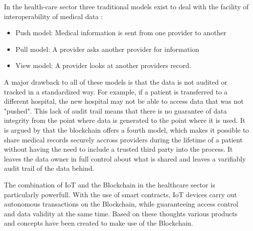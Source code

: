 In the health-care sector three traditional models exist to deal with the facility of interoperability of medical data \cite{Kshetri2017}:
\begin{itemize}
	\item Push model: Medical information is sent from one provider to another
	\item Pull model: A provider asks another provider for information
	\item View model: A provider looks at another providers record.
\end{itemize}
A major drawback to all of these models is that the data is not audited or tracked in a standardized way. For example, if a patient is transferred to a different hospital, the new hospital may not be able to access data that was not "pushed". This lack of audit trail means that there is no guarantee of data integrity from the point where data is generated to the point where it is used. 
It is argued by \cite{Kshetri2017} that the blockchain offers a fourth model, which makes it possible to share medical records securely accross providers during the lifetime of a patient without having the need to include a trusted third party into the process. It leaves the data owner in full control about what is shared and leaves a varifiably audit trail of the data behind.

The combination of IoT and the Blockchain in the healthcare sector is particularly powerfull. With the use of smart contracts, IoT devices carry out autonomous transactions on the Blockchain, while guaranteeing access control and data validity at the same time. Based on these thoughts various products and concepts have been created to make use of the Blockchain.




